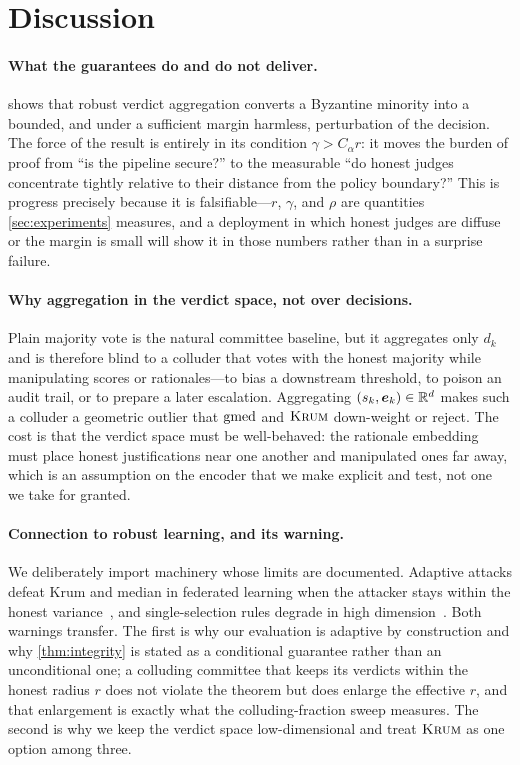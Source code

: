 \section{Discussion}
\label{sec:discussion}

\paragraph{What the guarantees do and do not deliver.}
 shows that robust verdict aggregation converts a Byzantine minority
into a bounded, and under a sufficient margin harmless, perturbation of the decision. The
force of the result is entirely in its condition $\gamma>C_\alpha r$: it moves the burden
of proof from ``is the pipeline secure?'' to the measurable ``do honest judges concentrate
tightly relative to their distance from the policy boundary?'' This is progress precisely
because it is falsifiable—$r$, $\gamma$, and $\rho$ are quantities \cref{sec:experiments}
measures, and a deployment in which honest judges are diffuse or the margin is small will
show it in those numbers rather than in a surprise failure.

\paragraph{Why aggregation in the verdict space, not over decisions.}
Plain majority vote is the natural committee baseline, but it aggregates only $d_k$ and is
therefore blind to a colluder that votes with the honest majority while manipulating scores
or rationales—to bias a downstream threshold, to poison an audit trail, or to prepare a
later escalation. Aggregating $(s_k,\bm{e}_k)\in\mathbb{R}^d$ makes such a colluder a geometric
outlier that $\operatorname{gmed}$ and $\textsc{Krum}$ down-weight or reject. The cost is that the verdict space
must be well-behaved: the rationale embedding must place honest justifications near one
another and manipulated ones far away, which is an assumption on the encoder that we make
explicit and test, not one we take for granted.

\paragraph{Connection to robust learning, and its warning.}
We deliberately import machinery whose limits are documented. Adaptive attacks defeat
Krum and median in federated learning when the attacker stays within the honest
variance~\cite{baruch2019little,fang2020poisoning,xie2019fall}, and single-selection rules
degrade in high dimension~\cite{mhamdi2018bulyan}. Both warnings transfer. The first is why
our evaluation is adaptive by construction and why \cref{thm:integrity} is stated as a
conditional guarantee rather than an unconditional one; a colluding committee that keeps its
verdicts within the honest radius $r$ does not violate the theorem but does enlarge the
effective $r$, and that enlargement is exactly what the colluding-fraction sweep measures.
The second is why we keep the verdict space low-dimensional and treat $\textsc{Krum}$ as one option
among three.

